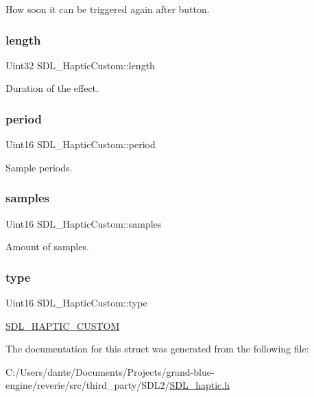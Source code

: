 How soon it can be triggered again after button. \mbox{\label{struct_s_d_l___haptic_custom_ad70e8bc2cff74b99d704a757c16b363f}} 
\subsubsection{\texorpdfstring{length}{length}}
{\footnotesize\ttfamily Uint32 S\+D\+L\+\_\+\+Haptic\+Custom\+::length}

Duration of the effect. \mbox{\label{struct_s_d_l___haptic_custom_aba7fafa808e90baddef25f009b8f4817}} 
\subsubsection{\texorpdfstring{period}{period}}
{\footnotesize\ttfamily Uint16 S\+D\+L\+\_\+\+Haptic\+Custom\+::period}

Sample periods. \mbox{\label{struct_s_d_l___haptic_custom_a5905ea1b6182da846535ca8c80b4fa33}} 
\subsubsection{\texorpdfstring{samples}{samples}}
{\footnotesize\ttfamily Uint16 S\+D\+L\+\_\+\+Haptic\+Custom\+::samples}

Amount of samples. \mbox{\label{struct_s_d_l___haptic_custom_a98a8995c94492069dc007502ed97eed2}} 
\subsubsection{\texorpdfstring{type}{type}}
{\footnotesize\ttfamily Uint16 S\+D\+L\+\_\+\+Haptic\+Custom\+::type}

\mbox{\hyperlink{_s_d_l__haptic_8h_a8a18c4de1076ac9bebd718329d16db29}{S\+D\+L\+\_\+\+H\+A\+P\+T\+I\+C\+\_\+\+C\+U\+S\+T\+OM}} 

The documentation for this struct was generated from the following file\+:\begin{DoxyCompactItemize}
\item 
C\+:/\+Users/dante/\+Documents/\+Projects/grand-\/blue-\/engine/reverie/src/third\+\_\+party/\+S\+D\+L2/\mbox{\hyperlink{_s_d_l__haptic_8h}{S\+D\+L\+\_\+haptic.\+h}}\end{DoxyCompactItemize}
